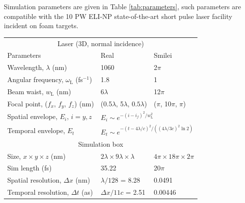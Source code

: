 Simulation parameters are given in Table \ref{tab:parameters}, such parameters are compatible with the 10 PW ELI-NP state-of-the-art short pulse laser facility \cite{tanakaCurrentStatusHighlights2020} incident on foam targets.
\begin{table}[]
	\begin{center}
		\begin{tabular}{lll}
			\hline \hline
			\multicolumn{3}{c}{Laser (3D, normal incidence)}   \\
			Parameters                                        & Real                                 & Smilei                         \\ \hline
			Wavelength, $\lambda$ (nm)                        & 1060                                 & 2$\pi$                      \\
			Angular frequency, $\omega_\mathrm{L}$ (fs$^{-1}$)         & 1.8                                  & 1                           \\
			Beam waist, $w_\mathrm{L}$ (nm)                            & 6$\lambda$                           & 12$\pi$                     \\
			Focal point, ($f_x$, $f_y$, $f_z$) (nm)                  & (0.5$\lambda$, 5$\lambda$, $0.5\lambda$)             & ($\pi$, 10$\pi$, $\pi$)           \vspace{0.25cm}\\ 
			Spatial envelope, $E_i$, $i = y,z$                           & \multicolumn{2}{l}{$E_i \sim e^{-(i-i_f)^2/w_\mathrm{L}^2}$}                \\
			Temporal envelope, $E_t$                          & \multicolumn{2}{l}{$E_t \sim e^{-(t-4\lambda/c)^2/((4\lambda/3c)^2\ln 2)}$} \vspace{0.15cm}\\ \hline \hline
			\multicolumn{3}{c}{Simulation box}   \\ \hline
			Size, $x \times y\times z$ (nm)                           & $2\lambda \times 9\lambda \times \lambda$          & $4\pi \times 18\pi \times 2\pi$         \\
			Sim length (fs)                                   & 35.22                                & 20$\pi$                     \\
			Spatial resolution, $\Delta x$ (nm)               & $\lambda/128$ = 8.28                 & 0.0491                      \\
			Temporal resolution, $\Delta t$ (as)              & $\Delta x/11c$ = 2.51               & 0.00446                   \vspace{0.15cm}  \\ \hline \hline

\end{tabular}
\end{center}
\end{table}
